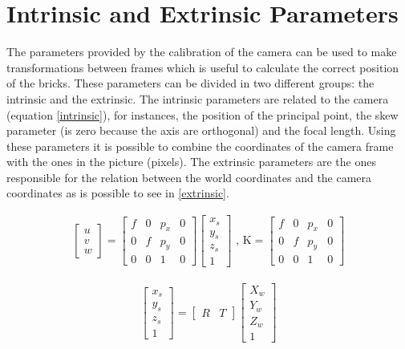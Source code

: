 \section{Intrinsic and Extrinsic Parameters}
The parameters provided by the calibration of the camera can be used to make transformations between frames which is useful to calculate the correct position of the bricks. These parameters can be divided in two different groups: the intrinsic and the extrinsic. The intrinsic parameters are related to the camera (equation \ref{intrinsic}), for instances, the position of the principal point, the skew parameter (is zero because the axis are orthogonal) and the focal length. Using these parameters it is possible to combine the coordinates of the camera frame with the ones in the picture (pixels). The extrinsic parameters are the ones responsible for the relation between the world coordinates and the camera coordinates as is possible to see in \ref{extrinsic}.

\begin{align} 
\label{intrinsic}
\begin{bmatrix}
    \textit{u} \\ 
    \textit{v} \\
    \textit{w} 
\end{bmatrix}
=
\begin{bmatrix}
    \textit{f}  & 0 & p_{x} & 0\\
    0   &  \textit{f} & p_{y} & 0  \\
    0 & 0 & 1 & 0 
\end{bmatrix}
\begin{bmatrix}
   x_{s}\\
   y_{s}\\
   z_{s}\\
	1
\end{bmatrix}
\text{  , K}
=
\begin{bmatrix}
    \textit{f}  & 0 & p_{x} & 0\\
    0   &  \textit{f} & p_{y} & 0  \\
    0 & 0 & 1 & 0 
\end{bmatrix}
\end{align}

\begin{align} 
\label{extrinsic}
\begin{bmatrix}
   x_{s}\\
   y_{s}\\
   z_{s}\\
	1
\end{bmatrix}
=
\begin{bmatrix}
    \textit{R}  & \textit{T}
\end{bmatrix}
\begin{bmatrix}
   X_{w}\\
   Y_{w}\\
   Z_{w}\\
	1
\end{bmatrix}
\end{align}

